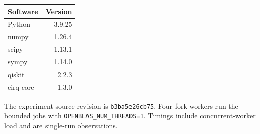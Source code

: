 \begin{center}\begin{tabular}{lr}\toprule Software & Version\\\midrule
Python & 3.9.25\\
numpy & 1.26.4\\
scipy & 1.13.1\\
sympy & 1.14.0\\
qiskit & 2.2.3\\
cirq-core & 1.3.0\\
\bottomrule\end{tabular}\end{center}
The experiment source revision is \texttt{b3ba5e26cb75}. Four fork workers run the bounded jobs with \texttt{OPENBLAS\_NUM\_THREADS=1}. Timings include concurrent-worker load and are single-run observations.
